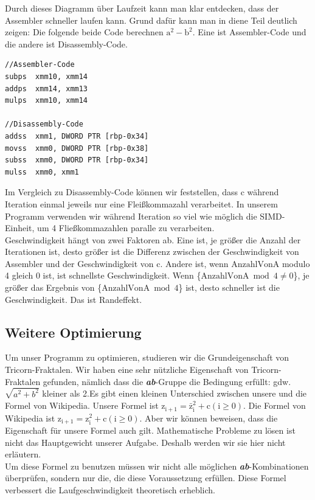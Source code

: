 \documentclass[course=erap]{aspdoc}
\begin{document}
Durch dieses Diagramm über Laufzeit kann man klar entdecken, dass der Assembler  schneller laufen kann. Grund dafür kann man in diene Teil deutlich zeigen:
Die folgende beide Code berechnen $\mathrm{a^2} -\mathrm{b^2}$. Eine ist Assembler-Code und die andere ist Disassembly-Code.
 \begin{lstlisting}
//Assembler-Code
subps  xmm10, xmm14
addps  xmm14, xmm13
mulps  xmm10, xmm14

//Disassembly-Code
addss  xmm1, DWORD PTR [rbp-0x34]
movss  xmm0, DWORD PTR [rbp-0x38]
subss  xmm0, DWORD PTR [rbp-0x34]
mulss  xmm0, xmm1
 \end{lstlisting}
Im Vergleich zu Disassembly-Code können wir feststellen, dass c während Iteration einmal jeweils nur eine Fleißkommazahl verarbeitet. In unserem Programm verwenden wir während Iteration so viel wie möglich die SIMD-Einheit, um 4 Fließkommazahlen paralle zu verarbeiten.
\\Geschwindigkeit hängt von zwei Faktoren ab. Eine ist, je größer die Anzahl der Iterationen ist, desto größer ist die Differenz zwischen der Geschwindigkeit von Assembler und der Geschwindigkeit von c. Andere ist, wenn $\mathrm{AnzahlVonA}$ modulo 4 gleich 0 ist, ist schnellste Geschwindigkeit. Wenn \{$\mathrm{AnzahlVonA} \bmod 4 \neq 0$\}, je größer das Ergebnis von \{$\mathrm{AnzahlVonA} \bmod 4$\} ist, desto schneller ist die Geschwindigkeit. Das ist Randeffekt.

\subsection{Weitere Optimierung}
Um unser Programm zu optimieren, studieren wir die Grundeigenschaft von Tricorn-Fraktalen. Wir haben eine sehr nützliche Eigenschaft von Tricorn-Fraktalen gefunden, nämlich dass die \textbf{\emph{ab}}-Gruppe die Bedingung erfüllt: gdw. $\sqrt{a^{2}+b^{2}}$ kleiner als 2.\cite{wiki:mandelbrot}Es gibt einen kleinen Unterschied zwischen unsere und die Formel von Wikipedia. Unsere Formel ist $\mathrm{z_{i+1}}=\mathrm{\bar{z}_{i}^{2}}+\mathrm{c}(\mathrm{i} \geq 0)$. Die Formel von Wikipedia  ist $\mathrm{z_{i+1}}=\mathrm{{z}_{i}^{2}}+\mathrm{c}(\mathrm{i} \geq 0)$. Aber wir können beweisen, dass die Eigenschaft für unsere Formel auch gilt. Mathematische Probleme zu lösen ist nicht das Hauptgewicht unserer Aufgabe. Deshalb werden wir sie hier nicht erläutern.
\\Um diese Formel zu benutzen müssen wir nicht alle möglichen \emph{\textbf{ab}}-Kombinationen überprüfen, sondern nur die, die diese Voraussetzung erfüllen. Diese Formel verbessert die Laufgeschwindigkeit theoretisch erheblich.
\end{document}
